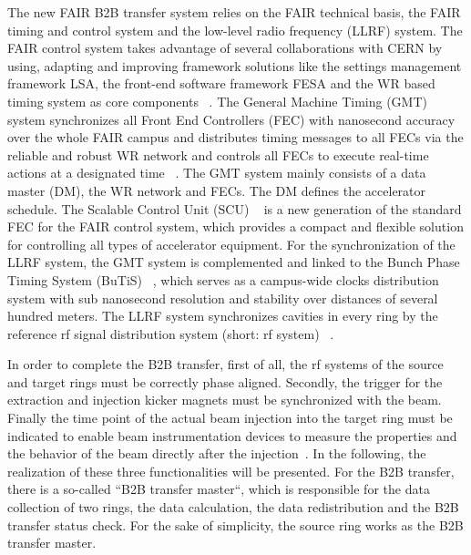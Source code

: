 The new FAIR B2B transfer system relies on the FAIR technical basis, the FAIR timing and control system and the low-level radio frequency (LLRF) system. The FAIR control system takes advantage of several collaborations with CERN by using, adapting and improving framework solutions like the settings management framework LSA, the front-end software framework FESA and the WR based timing system as core components ~\cite{huhmann_fair_2013}. The General Machine Timing (GMT) system synchronizes all Front End Controllers (FEC) with nanosecond accuracy over the whole FAIR campus and distributes timing messages to all FECs via the reliable and robust WR network and controls all FECs to execute real-time actions at a designated time ~\cite{beck_new_2012}. The GMT system mainly consists of a data master (DM), the WR network and FECs. The DM defines the accelerator schedule. The Scalable Control Unit (SCU) ~\cite{kaiser_f-tn-c-008e_2014} is a new generation of the standard FEC for the FAIR control system, which provides a compact and flexible solution for controlling all types of accelerator equipment. For the synchronization of the LLRF system, the GMT system is complemented and linked to the Bunch Phase Timing System (BuTiS) ~\cite{moritz_butisdevelopment_2006, moritz_f-cs-rf-14e_2012}, which serves as a campus-wide clocks distribution system with sub nanosecond resolution and stability over distances of several hundred meters. The LLRF system synchronizes cavities in every ring by the reference rf signal distribution system (short: rf system) ~\cite{klingbeil_detailed_2013}. 

In order to complete the B2B transfer, first of all, the rf systems of the source and target rings must be correctly phase aligned. Secondly, the trigger for the extraction and injection kicker magnets must be synchronized with the beam. Finally the time point of the actual beam injection into the target ring must be indicated to enable beam instrumentation devices to measure the properties and the behavior of the beam directly after the injection~\cite{bai_f-tc-c-05_2016}. In the following, the realization of these three functionalities will be presented. For the B2B transfer, there is a so-called “B2B transfer master“, which is responsible for the data collection of two rings, the data calculation, the data redistribution and the B2B transfer status check. For the sake of simplicity, the source ring works as the B2B transfer master.

